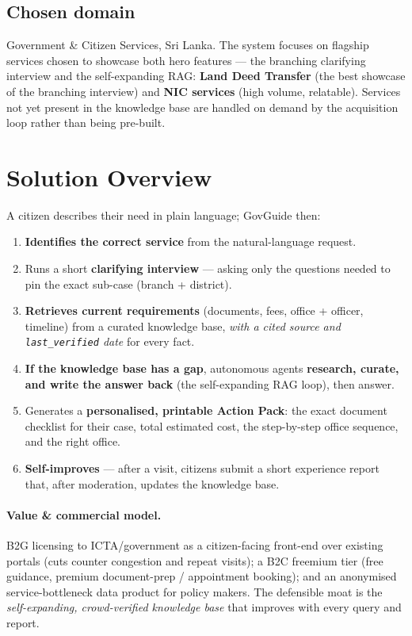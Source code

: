 \documentclass[11pt,a4paper]{article}
\begin{document}
\subsection{Chosen domain}
Government \& Citizen Services, Sri Lanka. The system focuses on flagship services chosen to showcase
both hero features --- the branching clarifying interview and the self-expanding RAG:
\textbf{Land Deed Transfer} (the best showcase of the branching interview) and \textbf{NIC services}
(high volume, relatable). Services not yet present in the knowledge base are handled on demand by the
acquisition loop rather than being pre-built.

\section{Solution Overview}
\label{sec:solution}

A citizen describes their need in plain language; GovGuide then:
\begin{enumerate}[leftmargin=1.6em]
  \item \textbf{Identifies the correct service} from the natural-language request.
  \item Runs a short \textbf{clarifying interview} --- asking only the questions needed to pin the
        exact sub-case (branch + district).
  \item \textbf{Retrieves current requirements} (documents, fees, office + officer, timeline) from a
        curated knowledge base, \emph{with a cited source and \texttt{last\_verified} date} for every
        fact.
  \item \textbf{If the knowledge base has a gap}, autonomous agents \textbf{research, curate, and
        write the answer back} (the self-expanding RAG loop), then answer.
  \item Generates a \textbf{personalised, printable Action Pack}: the exact document checklist for
        their case, total estimated cost, the step-by-step office sequence, and the right office.
  \item \textbf{Self-improves} --- after a visit, citizens submit a short experience report that,
        after moderation, updates the knowledge base.
\end{enumerate}

\paragraph{Value \& commercial model.} B2G licensing to ICTA/government as a citizen-facing
front-end over existing portals (cuts counter congestion and repeat visits); a B2C freemium tier
(free guidance, premium document-prep / appointment booking); and an anonymised
service-bottleneck data product for policy makers. The defensible moat is the
\emph{self-expanding, crowd-verified knowledge base} that improves with every query and report.
\end{document}
